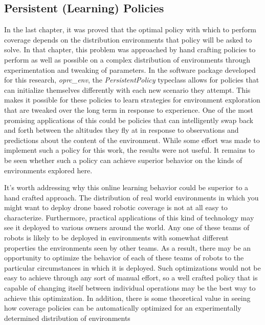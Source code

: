 \subsection{Persistent (Learning) Policies}

In the last chapter, it was proved that the optimal policy with which to perform coverage depends on the distribution environments that policy will be asked to solve. In that chapter, this problem was approached by hand crafting policies to perform as well as possible on a complex distribution of environments through experimentation and tweaking of parameters. In the software package developed for this research, \textit{oprc\_env}, the \textit{PersistentPolicy} typeclass allows for policies that can initialize themselves differently with each new scenario they attempt. This makes it possible for these policies to learn strategies for environment exploration that are tweaked over the long term in response to experience. One of the most promising applications of this could be policies that can intelligently swap back and forth between the altitudes they fly at in response to observations and predictions about the content of the environment. While some effort was made to implement such a policy for this work, the results were not useful. It remains to be seen whether such a policy can achieve superior behavior on the kinds of environments explored here.


It's worth addressing why this online learning behavior could be superior to a hand crafted approach. The distribution of real world environments in which you might want to deploy drone based robotic coverage is not at all easy to characterize. Furthermore, practical applications of this kind of  technology may see it deployed to various owners around the world. Any one of these teams of robots is likely to be deployed in environments with somewhat different properties the environments seen by other teams. As a result, there may be an opportunity to optimize the behavior of each of these teams of robots to the particular circumstances in which it is deployed. Such optimizations would not be easy to achieve through any sort of manual effort, so a well crafted policy that is capable of changing itself between individual operations may be the best way to achieve this optimization. In addition, there is some theoretical value in seeing how coverage policies can be automatically optimized for an experimentally determined distribution of environments

